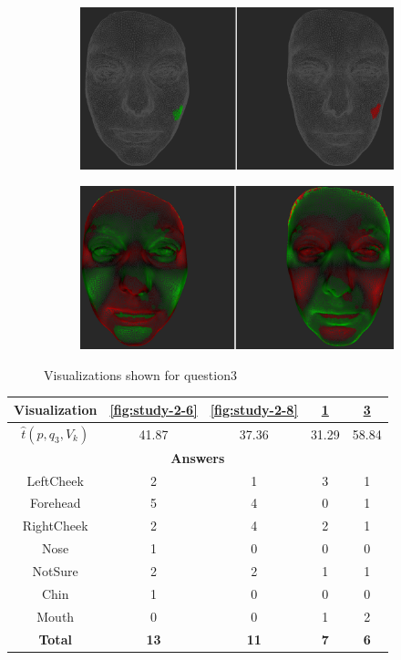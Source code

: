 \begin{figure}[h]
\begin{subfigure}{0.4\textwidth}
\includegraphics[width=\textwidth]{./screenshots/pair5.PNG}
\caption{}
\label{fig:study-2-5}
\end{subfigure}
\quad
\begin{subfigure}{0.4\textwidth}
\includegraphics[width=\textwidth]{./screenshots/pair7.PNG}
\caption{}
\label{fig:study-2-7}
\end{subfigure}
\caption{Visualizations shown for question3}
\end{figure}
\medskip

\begin{center}
\begin{tabular}{| c | c | c | c | c |}
	\hline
	Visualization & \ref{fig:study-2-6} & \ref{fig:study-2-8} & \ref{fig:study-2-5} & \ref{fig:study-2-7}\\ \hline
	\(\widehat{t}(p, q_3, V_k)\) & 41.87 & 37.36 & 31.29 & 58.84\\ \hline
	\multicolumn{5}{|c|}{\bf Answers} \\ \hline
	LeftCheek & 2 & 1 & 3 & 1\\ \hline
	Forehead & 5 & 4 & 0 & 1\\ \hline
	RightCheek & 2 & 4 & 2 & 1\\ \hline
	Nose & 1 & 0 & 0 & 0\\ \hline
	NotSure & 2 & 2 & 1 & 1\\ \hline
	Chin & 1 & 0 & 0 & 0\\ \hline
	Mouth & 0 & 0 & 1 & 2\\ \hline
	{\bf Total} & {\bf 13} & {\bf 11} & {\bf 7} & {\bf 6}\\ \hline
\end{tabular}
\end{center}
\clearpage

